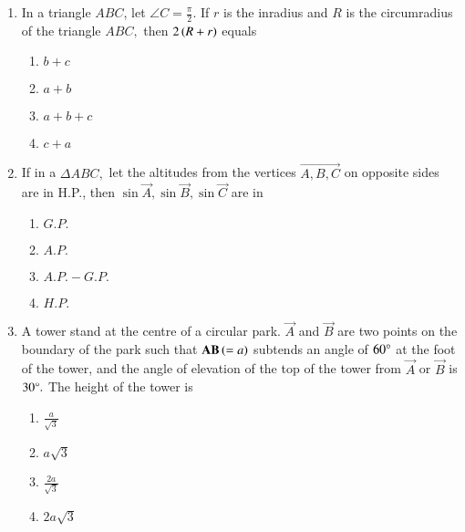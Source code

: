 \documentclass[journal]{IEEEtran}
\theoremstyle{remark}
\begin{document}
\begin{enumerate}
\hfill{}
\begin{multicols}{4}
\begin{enumerate}
        \item $60m$                    
        \item $30m$ 
        \item $40m$ 
        \item $20m$
\end{enumerate}
\end{multicols} 

\item In a triangle $ABC$, let $\angle{C}=\frac{\pi}{2}.$ If $r$ is the inradius and $R$ is the circumradius of the triangle $ABC,$ then $2\left(R+r\right)$ equals \hfill{}
\begin{multicols}{4}
\begin{enumerate}
        \item $b+c$                    
        \item $a+b$ 
        \item $a+b+c$ 
        \item $c+a$
\end{enumerate}
\end{multicols} 

\item If in a $\Delta ABC,$ let the altitudes from the vertices $\vec{A,B,C}$ on opposite sides are in H.P., then $\sin \vec{A},\sin \vec{B},\sin \vec{C}$ are in \hfill{}
\begin{multicols}{4}
\begin{enumerate}
        \item $G.P.$                    
        \item $A.P.$ 
        \item $A.P.-G.P.$ 
        \item $H.P.$
\end{enumerate}
\end{multicols} 

\item A tower stand at the centre of a circular park. $\vec{A}$ and $\vec{B}$ are two points on the boundary of the park such that $\mathbf{AB}\left(=a\right)$ subtends an angle of $60\degree$ at the foot of the tower, and the angle of elevation of the top of the tower from $\vec{A}$ or $\vec{B}$ is $30\degree.$ The height of the tower is \hfill{}
\begin{multicols}{4}
\begin{enumerate}
        \item $\frac{a}{\sqrt{3}}$                    
        \item $a\sqrt{3}$ 
        \item $\frac{2a}{\sqrt{3}}$ 
        \item $2a\sqrt{3}$
\end{enumerate}
\end{multicols} 


\end{enumerate}
\end{document}
